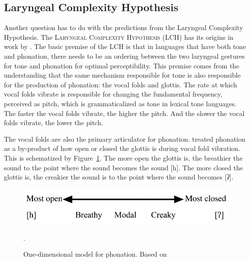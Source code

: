 \documentclass[12pt, letterpaper]{article}
\begin{document}
\subsection{Laryngeal Complexity Hypothesis} \label{sec:LCH}
Another question has to do with the predictions from the Laryngeal Complexity Hypothesis. The \textsc{Laryngeal Complexity Hypothesis} (LCH) has its origins in work by \citet{silvermanLaryngealComplexityOtomanguean1997,blankenshipTimeCourseBreathiness1997,blankenshipTimingNonmodalPhonation2002}. The basic premise of the LCH is that in languages that have both tone and phonation, there needs to be an ordering between the two laryngeal gestures for tone and phonation for optimal perceptibility. This premise comes from the understanding that the same mechanism responsible for tone is also responsible for the production of phonation: the vocal folds and glottis. The rate at which vocal folds vibrate is responsible for changing the fundamental frequency, perceived as pitch, which is grammaticalized as tone in lexical tone languages. The faster the vocal folds vibrate, the higher the pitch. And the slower the vocal folds vibrate, the lower the pitch. 

The vocal folds are also the primary articulator for phonation. \citet{ladefogedPreliminariesLinguisticPhonetics1971,gordonPhonationTypesCrosslinguistic2001} treated phonation as a by-product of how open or closed the glottis is during vocal fold vibration. This is schematized by Figure~\ref{fig:Phonation}. The more open the glottis is, the breathier the sound to the point where the sound becomes the sound [h]. The more closed the glottis is, the creakier the sound is to the point where the sound becomes [ʔ]. 

\begin{figure}[!ht]
	\centering
	\includegraphics[width=.6\textwidth]{Phonation.png}
	\caption{One-dimensional model for phonation. Based on \citet{ladefogedPreliminariesLinguisticPhonetics1971,gordonPhonationTypesCrosslinguistic2001}}.
	\label{fig:Phonation}
\end{figure}
\end{document}
